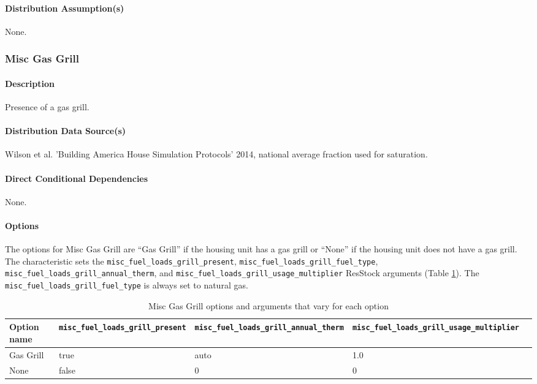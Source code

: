 \paragraph{Distribution Assumption(s)}
None.

\subsubsection{Misc Gas Grill}
\paragraph{Description}
Presence of a gas grill.

\paragraph{Distribution Data Source(s)}
Wilson et al. 'Building America House Simulation Protocols' 2014, national average fraction used for saturation.

\paragraph{Direct Conditional Dependencies}
None.

\paragraph{Options}

The options for Misc Gas Grill are ``Gas Grill'' if the housing unit has a gas grill or ``None'' if the housing unit does not have a gas grill. The characteristic sets the \texttt{misc\_fuel\_loads\_grill\_present}, \texttt{misc\_fuel\_loads\_grill\_fuel\_type}, \texttt{misc\_fuel\_loads\_grill\_annual\_therm}, and \texttt{misc\_fuel\_loads\_grill\_usage\_multiplier} ResStock arguments (Table \ref{table:hc_opt_def_gas_grill}).  The \texttt{misc\_fuel\_loads\_grill\_fuel\_type} is always set to natural gas.

\begin{longtable}[]{ |p{2.5cm}|p{3cm}|p{3cm}|p{3cm}|p{3cm}| }
\caption{Misc Gas Grill options and arguments that vary for each option} \label{table:hc_opt_def_gas_grill} \\
\toprule\noalign{}
Option name &
\texttt{misc\_fuel\_loads\_grill\_present} &
\texttt{misc\_fuel\_loads\_grill\_annual\_therm} &
\texttt{misc\_fuel\_loads\_grill\_usage\_multiplier} \\
\midrule\noalign{}
\endhead
\bottomrule\noalign{}
\endlastfoot
Gas Grill & true & auto & 1.0 \\
None & false & 0 & 0 \\
\end{longtable}

